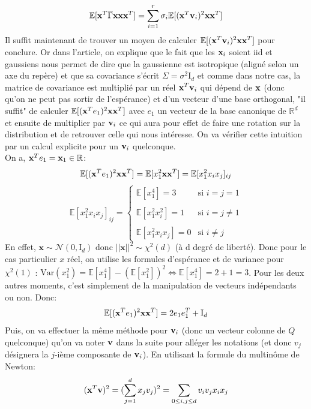 \documentclass[12pt]{article}
\begin{document}
$$
\mathbb{E}[{\bf x}^T\overline{\Gamma}{\bf x}{\bf x}{\bf x}^T] = \sum_{i = 1}^r \sigma_i \mathbb{E}[({\bf x}^T{\bf v}_ i)^2{\bf x}{\bf x}^T]
$$
Il suffit maintenant de trouver un moyen de calculer $\mathbb{E}[({\bf x}^T{\bf v}_ i)^2{\bf x}{\bf x}^T]$ pour conclure. Or dans l'article, on explique que le fait que les ${\bf x}_i$ soient iid et gaussiens nous permet de dire que la gaussienne est isotropique (aligné selon un axe du repère) et que sa covariance s'écrit $\Sigma = \sigma^2\text{I}_d$ et comme dans notre cas, la matrice de covariance est multiplié par un réel ${\bf x}^T{\bf v}_i$ qui dépend de ${\bf x}$ (donc qu'on ne peut pas sortir de l'espérance) et d'un vecteur d'une base orthogonal, "il suffit" de calculer $\mathbb{E}[({\bf x}^Te_ 1)^2{\bf x}{\bf x}^T]$ avec $e_1$ un vecteur de la base canonique de $\mathbb{R}^d$ et ensuite de multiplier par ${\bf v}_ i$ ce qui aura pour effet de faire une rotation sur la distribution et de retrouver celle qui nous intéresse. On va vérifier cette intuition par un calcul explicite pour un ${\bf v}_i$ quelconque.\\
On a, ${\bf x}^Te_1 = {\bf x}_ 1 \in \mathbb{R}$:
$$
\mathbb{E}[({\bf x}^Te_ 1)^2{\bf x}{\bf x}^T] = \mathbb{E}[x^2_1{\bf x}{\bf x}^T] = \mathbb{E}[x^2_1x_ix_j]_{ij}
$$
$$
\mathbb{E}[x^2_1x_ix_j]_{ij} = \left\{ 
\begin{array}{rcr}
\mathbb{E}[x^4_1] = 3 & \mbox{si	} i = j = 1 \\
\\
\mathbb{E}[x^2_1x^2_i] = 1 & \mbox{si	} i = j \neq 1\\
\\
\mathbb{E}[x^2_1x_ix_j] = 0 & \mbox{si	} i \neq j
\end{array}
\right.
$$
En effet, $\textbf{x}\sim \mathcal{N}(0, \text{I}_d)$ donc $\lvert \lvert \textbf{x} \rvert \rvert^2 \sim \chi^2(d)$ (à d degré de liberté). Donc pour le cas particulier $x$ réel, on utilise les formules d'espérance et de variance pour $\chi^2(1)$ : $\text{Var}(x^2_1) = \mathbb{E}[x^4_1] - (\mathbb{E}[x^2_1])^2 \Leftrightarrow \mathbb{E}[x^4_1] = 2 + 1 = 3$. Pour les deux autres moments, c'est simplement de la manipulation de vecteurs indépendants ou non.
Donc:
$$
\mathbb{E}[({\bf x}^Te_ 1)^2{\bf x}{\bf x}^T] = 2e_1e^T_1 + \text{I}_d
$$
Puis, on va effectuer la même méthode pour ${\bf v}_i$ (donc un vecteur colonne de $Q$ quelconque) qu'on va noter ${\bf v}$ dans la suite pour alléger les notations (et donc $v_j$ désignera la $j$-ième composante de ${\bf v}_i$). En utilisant la formule du multinôme de Newton:
$$
({\bf x}^T{\bf v})^2 = (\sum_{j = 1}^d x_jv_ j)^2 = \sum_{0\leq i,j\leq d} v_iv_jx_ix_j
$$
\end{document}
